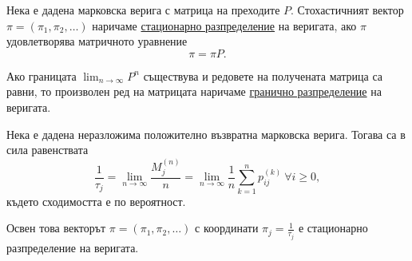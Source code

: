 \documentclass[numbers=endperiod, DIV=15, bibliography=totocnumbered]{scrartcl}
\begin{document}
\begin{definition}
  Нека е дадена марковска верига с матрица на преходите $P$. Стохастичният вектор $\pi = (\pi_1, \pi_2, \ldots)$ наричаме \uline{стационарно разпределение} на веригата, ако $\pi$ удовлетворява матричното уравнение
  \begin{displaymath}
    \pi = \pi P.
  \end{displaymath}

  Ако границата $\lim_{n \to \infty} P^n$ съществува и редовете на получената матрица са равни, то произволен ред на матрицата наричаме \uline{гранично разпределение} на веригата.
\end{definition}

\begin{theorem}
  Нека е дадена неразложима положително възвратна марковска верига. Тогава са в сила равенствата
  \begin{displaymath}
    \frac 1 {\tau_j}
    =
    \lim_{n \to \infty} \frac {M^{(n)}_j} n
    =
    \lim_{n \to \infty} \frac 1 n \sum_{k=1}^n p_{ij}^{(k)}~\forall i \geq 0,
  \end{displaymath}
  където сходимостта е по вероятност.

  Освен това векторът $\pi = (\pi_1, \pi_2, \ldots)$ с координати $\pi_j = \frac 1 {\tau_j}$ е стационарно разпределение на веригата.
\end{theorem}
\end{document}
